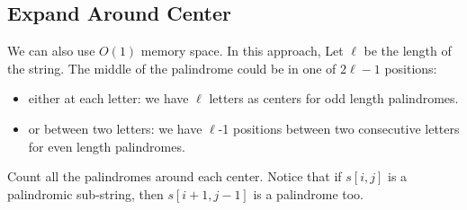 \subsection{Expand Around Center}
We can also use $O(1)$ memory space. In this approach, Let $\ell$ be the length of the string. The middle of the palindrome could be in one of $2\ell - 1$ positions: \begin{itemize}
\item either at each letter: we have $\ell$ letters as centers for odd length palindromes.
\item or between two letters: we have $\ell$-1 positions between two consecutive letters for even length palindromes.
\end{itemize}

Count all the palindromes around each center. Notice that if $s[i, j]$ is a palindromic sub-string, then $s[i+1, j-1]$ is a palindrome too.



